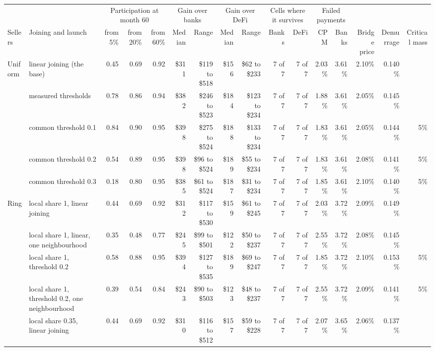 \begin{tabular}{llrrrrrrrrrrrrrr}
\toprule
 & & \multicolumn{3}{c}{Participation at month 60} & \multicolumn{2}{c}{Gain over banks} & \multicolumn{2}{c}{Gain over DeFi} & \multicolumn{2}{c}{Cells where it survives} & \multicolumn{2}{c}{Failed payments} & & & \\
Sellers & Joining and launch & from 5\% & from 20\% & from 60\% & Median & Range & Median & Range & Banks & DeFi & CPM & Banks & Bridge price & Demurrage & Critical mass \\
\midrule
Uniform & linear joining (the base) & 0.45 & 0.69 & 0.92 & \$311 & \$119 to \$518 & \$156 & \$62 to \$233 & 7 of 7 & 7 of 7 & 2.03\% & 3.61\% & 2.10\% & 0.140\% &  \\
 & measured thresholds & 0.78 & 0.86 & 0.94 & \$382 & \$246 to \$523 & \$184 & \$123 to \$234 & 7 of 7 & 7 of 7 & 1.88\% & 3.61\% & 2.05\% & 0.145\% &  \\
 & common threshold 0.1 & 0.84 & 0.90 & 0.95 & \$398 & \$275 to \$524 & \$188 & \$133 to \$234 & 7 of 7 & 7 of 7 & 1.83\% & 3.61\% & 2.05\% & 0.144\% & 5\% \\
 & common threshold 0.2 & 0.54 & 0.89 & 0.95 & \$398 & \$96 to \$524 & \$189 & \$55 to \$234 & 7 of 7 & 7 of 7 & 1.83\% & 3.61\% & 2.08\% & 0.141\% & 5\% \\
 & common threshold 0.3 & 0.18 & 0.80 & 0.95 & \$385 & \$61 to \$524 & \$187 & \$31 to \$234 & 7 of 7 & 7 of 7 & 1.85\% & 3.61\% & 2.10\% & 0.140\% & 5\% \\
\midrule
Ring & local share 1, linear joining & 0.44 & 0.69 & 0.92 & \$312 & \$117 to \$530 & \$159 & \$61 to \$245 & 7 of 7 & 7 of 7 & 2.03\% & 3.72\% & 2.09\% & 0.149\% &  \\
 & local share 1, linear, one neighbourhood & 0.35 & 0.48 & 0.77 & \$245 & \$99 to \$501 & \$122 & \$50 to \$237 & 7 of 7 & 7 of 7 & 2.55\% & 3.72\% & 2.08\% & 0.145\% &  \\
 & local share 1, threshold 0.2 & 0.58 & 0.88 & 0.95 & \$394 & \$127 to \$535 & \$189 & \$69 to \$247 & 7 of 7 & 7 of 7 & 1.85\% & 3.72\% & 2.10\% & 0.153\% & 5\% \\
 & local share 1, threshold 0.2, one neighbourhood & 0.39 & 0.54 & 0.84 & \$243 & \$90 to \$503 & \$123 & \$48 to \$237 & 7 of 7 & 7 of 7 & 2.55\% & 3.72\% & 2.09\% & 0.141\% & 5\% \\
 & local share 0.35, linear joining & 0.44 & 0.69 & 0.92 & \$310 & \$116 to \$512 & \$157 & \$59 to \$228 & 7 of 7 & 7 of 7 & 2.07\% & 3.65\% & 2.06\% & 0.137\% &  \\

\end{tabular}

